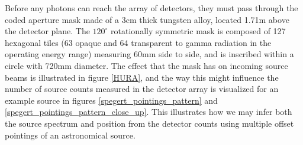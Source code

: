\documentclass{report}
\begin{document}
Before any photons can reach the array of detectors, they must pass through the coded aperture mask made of a 3cm thick tungsten alloy, located 1.71m above the detector plane. The $120^\circ$ rotationally symmetric mask is composed of 127 hexagonal tiles (63 opaque and 64 transparent to gamma radiation in the operating energy range) measuring 60mm side to side, and is inscribed within a circle with 720mm diameter. The effect that the mask has on incoming source beams is illustrated in figure \ref{HURA}, and the way this might influence the number of source counts measured in the detector array is visualized for an example source in figures \ref{spegert_pointings_pattern} and \ref{spegert_pointings_pattern_close_up}. This illustrates how we may infer both the source spectrum and position from the detector counts using multiple offset pointings of an astronomical source.
\end{document}
